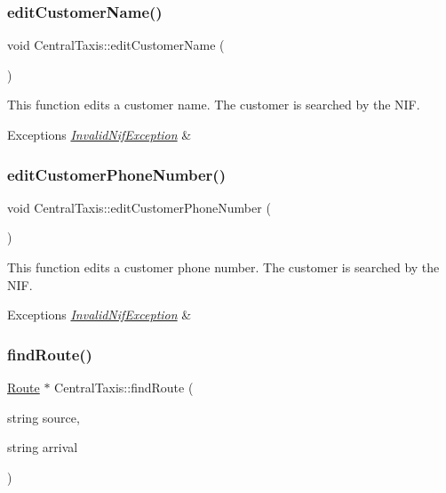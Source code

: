 \subsubsection{\texorpdfstring{edit\+Customer\+Name()}{editCustomerName()}}
{\footnotesize\ttfamily void Central\+Taxis\+::edit\+Customer\+Name (\begin{DoxyParamCaption}{ }\end{DoxyParamCaption})}

This function edits a customer name. The customer is searched by the N\+IF. 
\begin{DoxyExceptions}{Exceptions}
{\em \hyperlink{classInvalidNifException}{Invalid\+Nif\+Exception}} & \\
\hline
\end{DoxyExceptions}
\hypertarget{classCentralTaxis_a5e432b9d6c0379ec72c44c68f2c7985e}{}\label{classCentralTaxis_a5e432b9d6c0379ec72c44c68f2c7985e} 
\subsubsection{\texorpdfstring{edit\+Customer\+Phone\+Number()}{editCustomerPhoneNumber()}}
{\footnotesize\ttfamily void Central\+Taxis\+::edit\+Customer\+Phone\+Number (\begin{DoxyParamCaption}{ }\end{DoxyParamCaption})}

This function edits a customer phone number. The customer is searched by the N\+IF. 
\begin{DoxyExceptions}{Exceptions}
{\em \hyperlink{classInvalidNifException}{Invalid\+Nif\+Exception}} & \\
\hline
\end{DoxyExceptions}
\hypertarget{classCentralTaxis_ade8b270f8899bda1b78011a56cc2ee52}{}\label{classCentralTaxis_ade8b270f8899bda1b78011a56cc2ee52} 
\subsubsection{\texorpdfstring{find\+Route()}{findRoute()}}
{\footnotesize\ttfamily \hyperlink{classRoute}{Route} $\ast$ Central\+Taxis\+::find\+Route (\begin{DoxyParamCaption}\item[{string}]{source,  }\item[{string}]{arrival }\end{DoxyParamCaption})}

